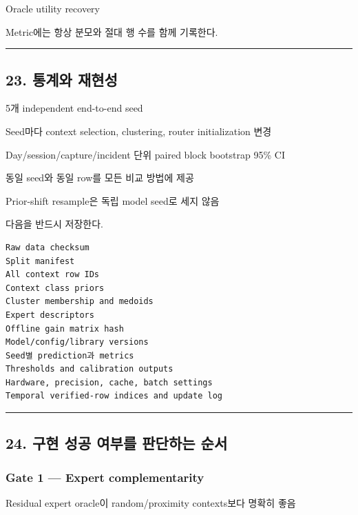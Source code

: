 \par\noindent \textbullet\enspace Oracle utility recovery


Metric에는 항상 분모와 절대 행 수를 함께 기록한다.


\medskip\hrule\medskip
\subsection{23. 통계와 재현성}
\par\noindent \textbullet\enspace 5개 independent end-to-end seed


\par\noindent \textbullet\enspace Seed마다 context selection, clustering, router initialization 변경


\par\noindent \textbullet\enspace Day/\allowbreak{}session/\allowbreak{}capture/\allowbreak{}incident 단위 paired block bootstrap 95\% CI


\par\noindent \textbullet\enspace 동일 seed와 동일 row를 모든 비교 방법에 제공


\par\noindent \textbullet\enspace Prior-shift resample은 독립 model seed로 세지 않음


다음을 반드시 저장한다.


\begin{Verbatim}[breaklines=true,breakanywhere=true,fontsize=\scriptsize]
Raw data checksum
Split manifest
All context row IDs
Context class priors
Cluster membership and medoids
Expert descriptors
Offline gain matrix hash
Model/config/library versions
Seed별 prediction과 metrics
Thresholds and calibration outputs
Hardware, precision, cache, batch settings
Temporal verified-row indices and update log

\end{Verbatim}

\medskip\hrule\medskip
\subsection{24. 구현 성공 여부를 판단하는 순서}
\subsubsection{Gate 1 — Expert complementarity}
\par\noindent \textbullet\enspace Residual expert oracle이 random/\allowbreak{}proximity contexts보다 명확히 좋음


